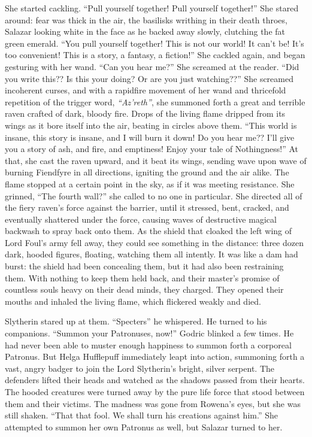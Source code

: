 She started cackling. “Pull yourself together! Pull yourself together!” She stared around: fear was thick in the air, the basilisks writhing in their death throes, Salazar looking white in the face as he backed away slowly, clutching the fat green emerald. “You pull yourself together! This is not our world! It can’t be! It’s too convenient! This is a story, a fantasy, a fiction!”
\SmallVSpace
She cackled again, and began gesturing with her wand. “Can you hear me?” She screamed at the reader. “Did you write this?? Is this your doing? Or are you just watching??” She screamed incoherent curses, and with a rapidfire movement of her wand and thricefold repetition of the trigger word, \emph{“Az’reth”}, she summoned forth a great and terrible raven crafted of dark, bloody fire.
\SmallVSpace
Drops of the living flame dripped from its wings as it bore itself into the air, beating in circles above them. “This world is insane, this story is insane, and I will burn it down! Do you hear me?? I’ll give you a story of ash, and fire, and emptiness! Enjoy your tale of Nothingness!”
\SmallVSpace
At that, she cast the raven upward, and it beat its wings, sending wave upon wave of burning Fiendfyre in all directions, igniting the ground and the air alike. The flame stopped at a certain point in the sky, as if it was meeting resistance. She grinned, “The fourth wall?” she called to no one in particular. She directed all of the fiery raven’s force against the barrier, until it stressed, bent, cracked, and eventually shattered under the force, causing waves of destructive magical backwash to spray back onto them.
\SmallVSpace
As the shield that cloaked the left wing of Lord Foul’s army fell away, they could see something in the distance: three dozen dark, hooded figures, floating, watching them all intently. It was like a dam had burst: the shield had been concealing them, but it had also been restraining them. With nothing to keep them held back, and their master’s promise of countless souls heavy on their dead minds, they charged. They opened their mouths and inhaled the living flame, which flickered weakly and died.

Slytherin stared up at them. “Specters{\el}” he whispered. He turned to his companions. “Summon your Patronuses, now!” Godric blinked a few times. He had never been able to muster enough happiness to summon forth a corporeal Patronus. But Helga Hufflepuff immediately leapt into action, summoning forth a vast, angry badger to join the Lord Slytherin’s bright, silver serpent.
\SmallVSpace
The defenders lifted their heads and watched as the shadows passed from their hearts. The hooded creatures were turned away by the pure life force that stood between them and their victims. The madness was gone from Rowena’s eyes, but she was still shaken. “That{\el} that fool. We shall turn his creations against him.” She attempted to summon her own Patronus as well, but Salazar turned to her.

